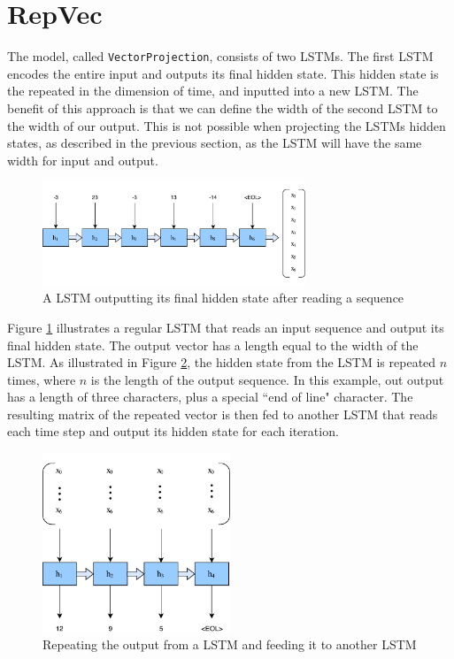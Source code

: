 \section{RepVec}
The model, called {\tt VectorProjection}, consists of two LSTMs. The first LSTM encodes the entire input and outputs its final hidden state. This hidden state is the repeated in the dimension of time, and inputted into a new LSTM. The benefit of this approach is that we can define the width of the second LSTM to the width of our output. This is not possible when projecting the LSTMs hidden states, as described in the previous section, as the LSTM will have the same width for input and output.

\begin{figure}[ht]
    \centering
    \includegraphics[width=0.7\textwidth]{fig/development_process/lstm-vector-projection-encoder.pdf}
    \caption{A LSTM outputting its final hidden state after reading a sequence}
    \label{fig:lstm-vector-projection-encoder}
\end{figure}

Figure \ref{fig:lstm-vector-projection-encoder} illustrates a regular LSTM that reads an input sequence and output its final hidden state. The output vector has a length equal to the width of the LSTM. As illustrated in Figure \ref{fig:lstm-vector-projection-decoder}, the hidden state from the LSTM is repeated \(n\) times, where \(n\) is the length of the output sequence. In this example, out output has a length of three characters, plus a special ``end of line" character. The resulting matrix of the repeated vector is then fed to another LSTM that reads each time step and output its hidden state for each iteration.

\begin{figure}[ht]
    \centering
    \includegraphics[width=0.5\textwidth]{fig/development_process/lstm-vector-projection-decoder.pdf}
    \caption{Repeating the output from a LSTM and feeding it to another LSTM}
    \label{fig:lstm-vector-projection-decoder}
\end{figure}

